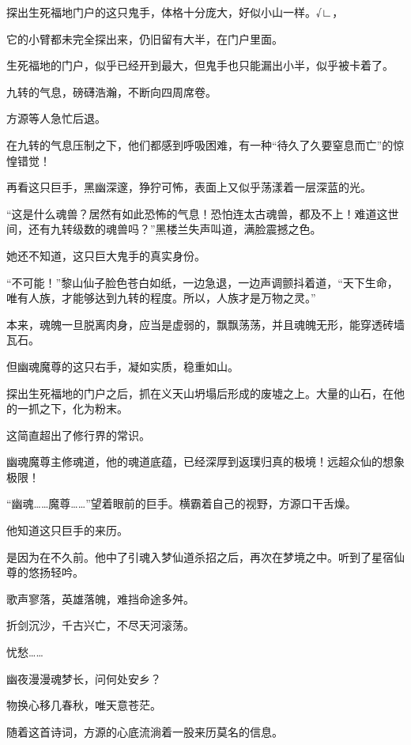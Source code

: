 
\begin{this_body}

探出生死福地门户的这只鬼手，体格十分庞大，好似小山一样。√∟，

它的小臂都未完全探出来，仍旧留有大半，在门户里面。

生死福地的门户，似乎已经开到最大，但鬼手也只能漏出小半，似乎被卡着了。

九转的气息，磅礴浩瀚，不断向四周席卷。

方源等人急忙后退。

在九转的气息压制之下，他们都感到呼吸困难，有一种“待久了久要窒息而亡”的惊惶错觉！

再看这只巨手，黑幽深邃，狰狞可怖，表面上又似乎荡漾着一层深蓝的光。

“这是什么魂兽？居然有如此恐怖的气息！恐怕连太古魂兽，都及不上！难道这世间，还有九转级数的魂兽吗？”黑楼兰失声叫道，满脸震撼之色。

她还不知道，这只巨大鬼手的真实身份。

“不可能！”黎山仙子脸色苍白如纸，一边急退，一边声调颤抖着道，“天下生命，唯有人族，才能够达到九转的程度。所以，人族才是万物之灵。”

本来，魂魄一旦脱离肉身，应当是虚弱的，飘飘荡荡，并且魂魄无形，能穿透砖墙瓦石。

但幽魂魔尊的这只右手，凝如实质，稳重如山。

探出生死福地的门户之后，抓在义天山坍塌后形成的废墟之上。大量的山石，在他的一抓之下，化为粉末。

这简直超出了修行界的常识。

幽魂魔尊主修魂道，他的魂道底蕴，已经深厚到返璞归真的极境！远超众仙的想象极限！

“幽魂……魔尊……”望着眼前的巨手。横霸着自己的视野，方源口干舌燥。

他知道这只巨手的来历。

是因为在不久前。他中了引魂入梦仙道杀招之后，再次在梦境之中。听到了星宿仙尊的悠扬轻吟。

歌声寥落，英雄落魄，难挡命途多舛。

折剑沉沙，千古兴亡，不尽天河滚荡。

忧愁……

幽夜漫漫魂梦长，问何处安乡？

物换心移几春秋，唯天意苍茫。

随着这首诗词，方源的心底流淌着一股来历莫名的信息。


\end{this_body}
